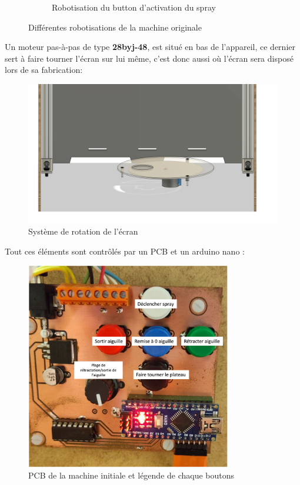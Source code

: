 \begin{figure}[H]
\begin{subfigure}{.65\textwidth}
    \caption{Robotisation du button d'activation du spray}
    \label{fig:robot_spray}
  \end{subfigure}
  \caption{Différentes robotisations de la machine originale}
  \label{fig:robotisations_aerographe}
\end{figure}

Un moteur pas-à-pas de type \textbf{28byj-48}, est situé en bas de l'appareil, ce dernier sert à faire tourner l'écran sur lui même,
c'est donc aussi où l'écran sera disposé lors de sa fabrication:
\begin{figure}[H]
  \centering
  \includegraphics[width = \textwidth]{assets/figures/situation_initiale/rotation_ecran_initiale.png}
  \caption[Rotation écran initiale]{Système de rotation de l'écran}

\end{figure}

\newpage
Tout ces éléments sont contrôlés par un PCB et un arduino nano :
\begin{figure}[H]
  \centering
  \includegraphics[width = 0.8\textwidth]{assets/figures/situation_initiale/PCB_machine_originale.png}
  \caption[PCB machine initiale]{PCB de la machine initiale et légende de chaque boutons}\label{PCB_machine_initial}
\end{figure}

